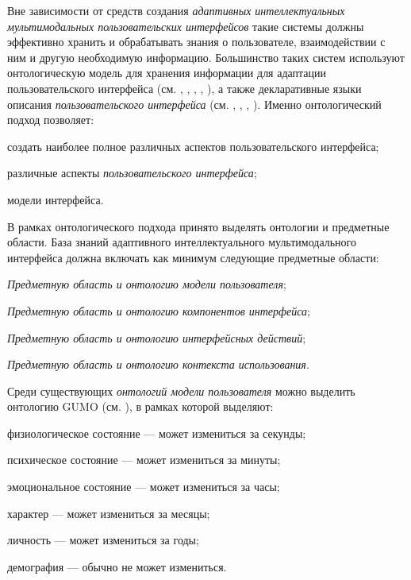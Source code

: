 Вне зависимости от средств создания \textit{адаптивных интеллектуальных мультимодальных пользовательских интерфейсов} такие системы должны эффективно хранить и обрабатывать знания о пользователе, взаимодействии с ним и другую необходимую информацию. Большинство таких систем используют онтологическую модель для хранения информации для адаптации пользовательского интерфейса (см. , , , , ), а также декларативные языки описания \textit{пользовательского интерфейса} (см. , , , ). Именно онтологический подход позволяет:
\begin{textitemize}
	\item создать наиболее полное  различных аспектов пользовательского интерфейса;
	\item {} различные аспекты \textit{пользовательского интерфейса};
	\item {} модели интерфейса.
\end{textitemize}

В рамках онтологического подхода принято выделять онтологии и предметные области. База знаний адаптивного интеллектуального мультимодального интерфейса должна включать как минимум следующие предметные области:
\begin{textitemize}
	\item \textit{Предметную область и онтологию модели пользователя}; 
	\item \textit{Предметную область и онтологию компонентов интерфейса};
	\item \textit{Предметную область и онтологию интерфейсных действий};
	\item \textit{Предметную область и онтологию контекста использования}.
\end{textitemize}

Среди существующих \textit{онтологий модели пользователя} можно выделить онтологию GUMO (см. ), в рамках которой выделяют:
\begin{textitemize}
	\item физиологическое состояние --- может измениться за секунды;
	\item психическое состояние --- может измениться за минуты;
	\item эмоциональное состояние --- может измениться за часы;
	\item характер --- может измениться за месяцы;
	\item личность --- может измениться за годы;
	\item демография --- обычно не может измениться.
\end{textitemize}

